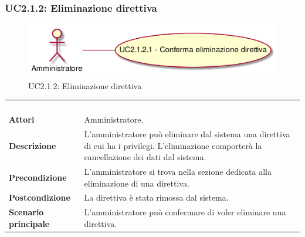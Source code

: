 \newpage\subsubsection{UC2.1.2: Eliminazione direttiva }
\label{UC2.1.2}
\begin{figure}[h]
\centering
\includegraphics[width=\textwidth,height=\textheight,keepaspectratio]{images/UseCaseUC212.png}
\caption{UC2.1.2: Eliminazione direttiva }
\end{figure}
\begin{longtable}{l|p{10cm}}
\rowcolor[gray]{0.8} \multicolumn{2}{c}{} \\
\rowcolor[gray]{0.8} \multicolumn{2}{c}{\textbf{UC2.1.2 - Eliminazione direttiva }} \\
\rowcolor[gray]{0.8} \multicolumn{2}{c}{} \\
\hline
&\\
\textbf{Attori} & Amministratore.\\[7pt]
\textbf{Descrizione} & L'amministratore può eliminare dal sistema una direttiva di cui ha i privilegi. L'eliminazione comporterà la cancellazione dei dati dal sistema.\\[7pt]
\textbf{Precondizione} & L'amministratore si trova nella sezione dedicata alla eliminazione di una direttiva.\\[7pt]
\textbf{Postcondizione} & La direttiva è stata rimossa dal sistema.\\[7pt]
\textbf{Scenario principale} &L'amministratore può confermare di voler eliminare una direttiva.\\[7pt]\hline
\end{longtable}

